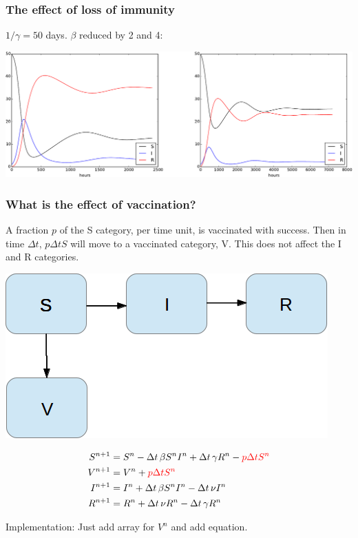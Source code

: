 \documentclass{beamer}
\newenvironment{block_mdfboxadmon}[1][]{\begin{block}{#1}}{\end{block}}
\begin{document}
\begin{frame}
\frametitle{The effect of loss of immunity}

$1/\gamma = 50$ days. $\beta$ reduced by 2 and 4:


\begin{center}  %
  \centerline{\includegraphics[width=0.9\linewidth]{fig/SIR2.pdf}}
\end{center}
\end{frame}

\begin{frame}
\frametitle{What is the effect of vaccination?}

\begin{block_mdfboxadmon}[Assumptions.]
A fraction $p$ of the S category, per time unit, is vaccinated with
success. Then in time $\Delta t$, $p\Delta t S$ will move to a
vaccinated category, V. This does not affect the I and R categories.
\end{block_mdfboxadmon}




\begin{center}  %
  \centerline{\includegraphics[width=0.4\linewidth]{fig/categories_SIRV.png}}
\end{center}


\begin{align}
S^{n+1} &= S^n - \Delta t\,\beta S^nI^n + \Delta t\,\gamma R^n - \color{red}{p\Delta t S^n}
\label{SIR3:S}\\
V^{n+1} &= V^n + \color{red}{p\Delta t S^n}
\label{SIR3:V}\\
I^{n+1} &= I^n + \Delta t\,\beta S^nI^n -\Delta t\,\nu I^n
\label{SIR3:I}\\
R^{n+1} &= R^n + \Delta t\,\nu R^n - \Delta t\,\gamma R^n
\label{SIR3:R}
\end{align}

Implementation: Just add array for $V^n$ and add equation.
\end{frame}
\end{document}
